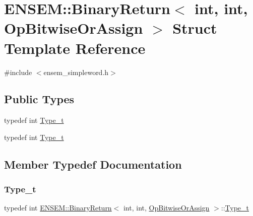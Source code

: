 \hypertarget{structENSEM_1_1BinaryReturn_3_01int_00_01int_00_01OpBitwiseOrAssign_01_4}{}\section{E\+N\+S\+EM\+:\+:Binary\+Return$<$ int, int, Op\+Bitwise\+Or\+Assign $>$ Struct Template Reference}
\label{structENSEM_1_1BinaryReturn_3_01int_00_01int_00_01OpBitwiseOrAssign_01_4}


{\ttfamily \#include $<$ensem\+\_\+simpleword.\+h$>$}

\subsection*{Public Types}
\begin{DoxyCompactItemize}
\item 
typedef int \mbox{\hyperlink{structENSEM_1_1BinaryReturn_3_01int_00_01int_00_01OpBitwiseOrAssign_01_4_a39b11e165103fedd3dd7ec8e4ef89d93}{Type\+\_\+t}}
\item 
typedef int \mbox{\hyperlink{structENSEM_1_1BinaryReturn_3_01int_00_01int_00_01OpBitwiseOrAssign_01_4_a39b11e165103fedd3dd7ec8e4ef89d93}{Type\+\_\+t}}
\end{DoxyCompactItemize}


\subsection{Member Typedef Documentation}
\mbox{\label{structENSEM_1_1BinaryReturn_3_01int_00_01int_00_01OpBitwiseOrAssign_01_4_a39b11e165103fedd3dd7ec8e4ef89d93}} 
\subsubsection{\texorpdfstring{Type\_t}{Type\_t}\hspace{0.1cm}{\footnotesize\ttfamily [1/2]}}
{\footnotesize\ttfamily typedef int \mbox{\hyperlink{structENSEM_1_1BinaryReturn}{E\+N\+S\+E\+M\+::\+Binary\+Return}}$<$ int, int, \mbox{\hyperlink{structENSEM_1_1OpBitwiseOrAssign}{Op\+Bitwise\+Or\+Assign}} $>$\+::\mbox{\hyperlink{structENSEM_1_1BinaryReturn_3_01int_00_01int_00_01OpBitwiseOrAssign_01_4_a39b11e165103fedd3dd7ec8e4ef89d93}{Type\+\_\+t}}}

